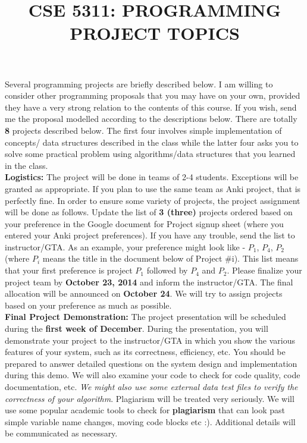 \documentclass[12pt]{article}
\title{CSE 5311: PROGRAMMING PROJECT TOPICS}
\author{}
\date{}
\begin{document}
\maketitle

Several programming projects are briefly described below. I am willing to consider other programming proposals that you may have on your own, provided they have a very strong relation to the contents of this course. If you wish, send me the proposal modelled according to the descriptions below. There are totally {\bf 8} projects described below. The first four involves simple implementation of concepts/ data structures described in the class while the latter four asks you to solve some practical problem using algorithms/data structures that you learned in the class.\\

{\bf Logistics:} The project will be done in teams of 2-4 students. Exceptions will be granted as appropriate. If you plan to use the same team as Anki project, that is perfectly fine. In order to ensure some variety of projects, the project assignment will be done as follows. Update the list of {\bf 3 (three)} projects ordered based on your preference in the Google document for Project signup sheet (where you entered your Anki project preferences). If you have any trouble, send the list to instructor/GTA. As an example, your preference might look like - $P_1$, $P_4$, $P_2$ (where $P_i$ means the title in the document below of Project \#i). This list means that your first preference is project $P_1$ followed by $P_4$ and $P_2$.  Please finalize your project team by {\bf October 23, 2014} and inform the instructor/GTA. The final allocation will be announced on {\bf October 24}. We will try to assign projects based on your preference as much as possible. \\

{\bf Final Project Demonstration:} The project presentation will be scheduled during the {\bf first week of December}.  During the presentation, you will demonstrate your project to the instructor/GTA in which you show the various features of your system, such as its correctness, efficiency, etc. You  should be prepared to answer detailed questions on the system design and implementation during this demo. We will also examine your code to check for code quality, code documentation, etc. {\em We might also use some external data test files to verify the correctness of your algorithm}. Plagiarism will be treated very seriously. We will use some popular academic tools to check for {\bf plagiarism} that can look past simple variable name changes, moving code blocks etc :). Additional details will be communicated as necessary. \\
\end{document}
